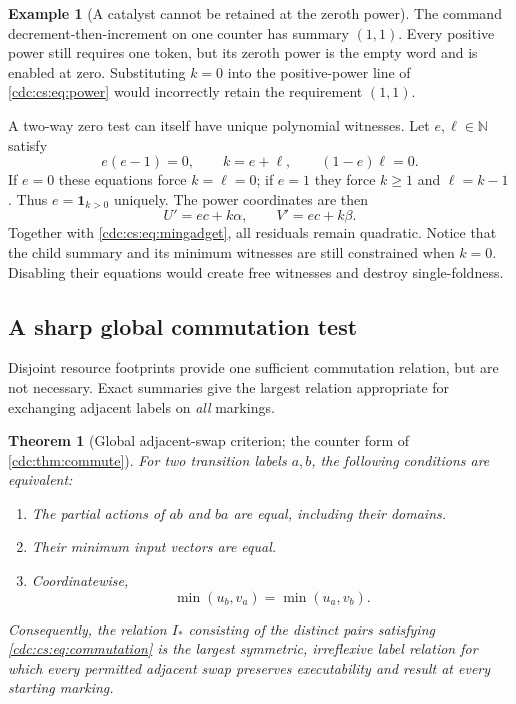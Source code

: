 \documentclass[11pt,a4paper]{article}
\newtheorem{theorem}{Theorem}[section]
\theoremstyle{definition}
\newtheorem{example}[example]{Example}
\theoremstyle{remark}
\newcommand{\N}{\mathbb N}
\begin{document}
\begin{example}[A catalyst cannot be retained at the zeroth power]
The command decrement-then-increment on one counter has summary $(1,1)$.
Every positive power still requires one token, but its zeroth power is the
empty word and is enabled at zero. Substituting $k=0$ into the positive-power
line of \eqref{cdc:cs:eq:power} would incorrectly retain the requirement $(1,1)$.
\end{example}

A two-way zero test can itself have unique polynomial witnesses. Let
$e,\ell\in\N$ satisfy
\begin{equation}
\label{cdc:cs:eq:twoway}
e(e-1)=0,\qquad k=e+\ell,\qquad (1-e)\ell=0.
\end{equation}
If $e=0$ these equations force $k=\ell=0$; if $e=1$ they force $k\geq1$ and
$\ell=k-1$. Thus $e=\mathbf1_{k>0}$ uniquely. The power coordinates are then
\begin{equation}
\label{cdc:cs:eq:powergadget}
U'=ec+k\alpha,\qquad V'=ec+k\beta.
\end{equation}
Together with \eqref{cdc:cs:eq:mingadget}, all residuals remain quadratic. Notice
that the child summary and its minimum witnesses are still constrained when
$k=0$. Disabling their equations would create free witnesses and destroy
single-foldness.

\subsection{A sharp global commutation test}

Disjoint resource footprints provide one sufficient commutation relation,
but are not necessary. Exact summaries give the largest relation appropriate
for exchanging adjacent labels on \emph{all} markings.

\begin{theorem}[Global adjacent-swap criterion; the counter form of \cref{cdc:thm:commute}]
\label{cdc:cs:thm:commutation}
For two transition labels $a,b$, the following conditions are equivalent:
\begin{enumerate}[label=\textnormal{(\roman*)},leftmargin=2em]
\item The partial actions of $ab$ and $ba$ are equal, including their domains.
\item Their minimum input vectors are equal.
\item Coordinatewise,
\begin{equation}
\label{cdc:cs:eq:commutation}
\min(u_b,v_a)=\min(u_a,v_b).
\end{equation}
\end{enumerate}
Consequently, the relation $I_*$ consisting of the distinct pairs satisfying
\eqref{cdc:cs:eq:commutation} is the largest symmetric, irreflexive label relation
for which every permitted adjacent swap preserves executability and result
at every starting marking.
\end{theorem}
\end{document}
